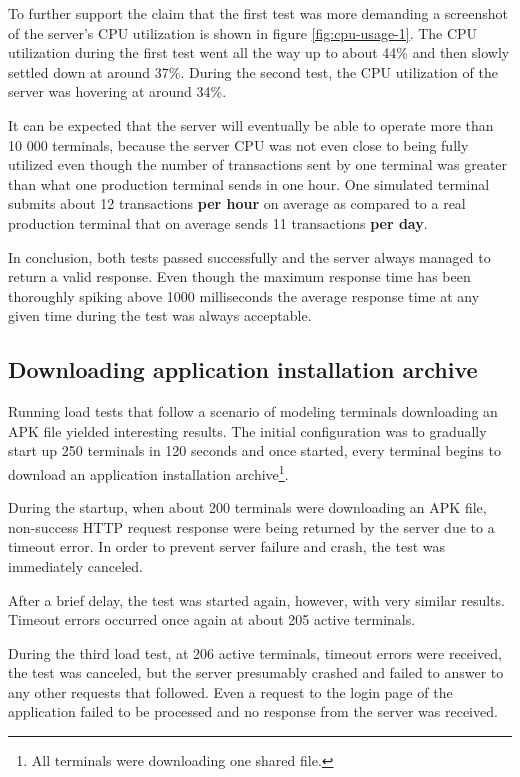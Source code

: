 \documentclass[12pt, a4paper]{article}
\begin{document}
To further support the claim that the first test was more demanding a screenshot of the server's CPU utilization is shown in figure \ref{fig:cpu-usage-1}.
The CPU utilization during the first test went all the way up to about 44\% and then slowly settled down at around 37\%.
During the second test, the CPU utilization of the server was hovering at around 34\%.

It can be expected that the server will eventually be able to operate more than 10 000 terminals, because the server CPU was not even close to being fully utilized even though the number of transactions sent by one terminal was greater than what one production terminal sends in one hour.
One simulated terminal submits about 12 transactions \textbf{per hour} on average as compared to a real production terminal that on average sends 11 transactions \textbf{per day}.

In conclusion, both tests passed successfully and the server always managed to return a valid response.
Even though the maximum response time has been thoroughly spiking above 1000 milliseconds the average response time at any given time during the test was always acceptable.


\subsection{Downloading application installation archive}

Running load tests that follow a scenario of modeling terminals downloading an APK file yielded interesting results.
The initial configuration was to gradually start up 250 terminals in 120 seconds and once started, every terminal begins to download an application installation archive\footnote{All terminals were downloading one shared file.}.

During the startup, when about 200 terminals were downloading an APK file, non-success HTTP request response were being returned by the server due to a timeout error.
In order to prevent server failure and crash, the test was immediately canceled.

After a brief delay, the test was started again, however, with very similar results.
Timeout errors occurred once again at about 205 active terminals.

During the third load test, at 206 active terminals, timeout errors were received, the test was canceled, but the server presumably crashed and failed to answer to any other requests that followed.
Even a request to the login page of the application failed to be processed and no response from the server was received. 
\end{document}
